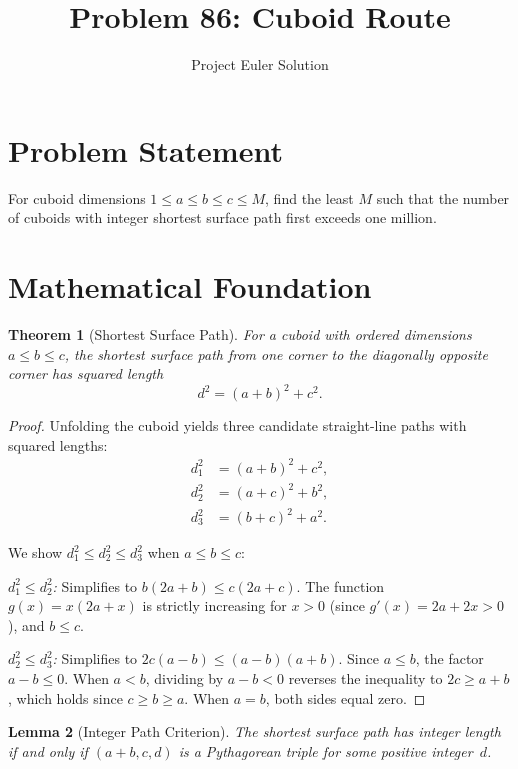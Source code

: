 \documentclass[12pt]{article}
\title{Problem 86: Cuboid Route}
\author{Project Euler Solution}
\date{}
\newtheorem{theorem}{Theorem}
\newtheorem{lemma}[theorem]{Lemma}
\begin{document}
\maketitle

\section{Problem Statement}

For cuboid dimensions $1 \leq a \leq b \leq c \leq M$, find the least $M$ such that the number of cuboids with integer shortest surface path first exceeds one million.

\section{Mathematical Foundation}

\begin{theorem}[Shortest Surface Path]
For a cuboid with ordered dimensions $a \leq b \leq c$, the shortest surface path from one corner to the diagonally opposite corner has squared length
\[
d^2 = (a + b)^2 + c^2.
\]
\end{theorem}

\begin{proof}
Unfolding the cuboid yields three candidate straight-line paths with squared lengths:
\begin{align}
d_1^2 &= (a+b)^2 + c^2, \\
d_2^2 &= (a+c)^2 + b^2, \\
d_3^2 &= (b+c)^2 + a^2.
\end{align}

We show $d_1^2 \leq d_2^2 \leq d_3^2$ when $a \leq b \leq c$:

\emph{$d_1^2 \leq d_2^2$:} Simplifies to $b(2a+b) \leq c(2a+c)$. The function $g(x) = x(2a+x)$ is strictly increasing for $x > 0$ (since $g'(x) = 2a + 2x > 0$), and $b \leq c$.

\emph{$d_2^2 \leq d_3^2$:} Simplifies to $2c(a - b) \leq (a - b)(a + b)$. Since $a \leq b$, the factor $a - b \leq 0$. When $a < b$, dividing by $a - b < 0$ reverses the inequality to $2c \geq a + b$, which holds since $c \geq b \geq a$. When $a = b$, both sides equal zero.
\end{proof}

\begin{lemma}[Integer Path Criterion]
The shortest surface path has integer length if and only if $(a+b, c, d)$ is a Pythagorean triple for some positive integer~$d$.
\end{lemma}
\end{document}
